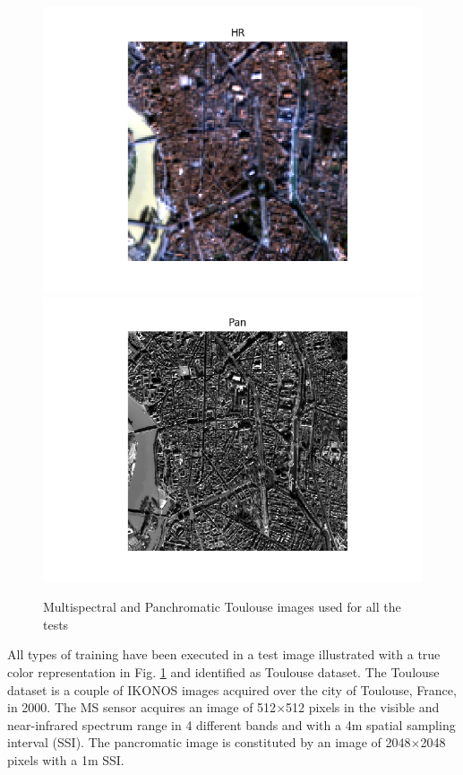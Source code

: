 \documentclass[12pt]{report}
\begin{document}
\begin{figure}[t]
    \centering
    \includegraphics[scale=.5]{toulouse.png}
    \includegraphics[scale=.5]{toulouse_pan.png}
    \caption{Multispectral and Panchromatic Toulouse images used for all the tests}
    \label{fig:toulouse}
\end{figure}


All types of training have been executed in a test image illustrated with a true color representation in Fig. \ref{fig:toulouse} and identified as Toulouse dataset.
The Toulouse dataset is a couple of IKONOS images acquired over the city of Toulouse, France, in 2000.
The MS sensor acquires an image of 512$\times$512 pixels in the visible and near-infrared spectrum range in 4
different bands and with a 4m spatial sampling interval (SSI). 
The pancromatic image is constituted by an image of 2048$\times$2048 pixels with a 1m SSI.
\end{document}
